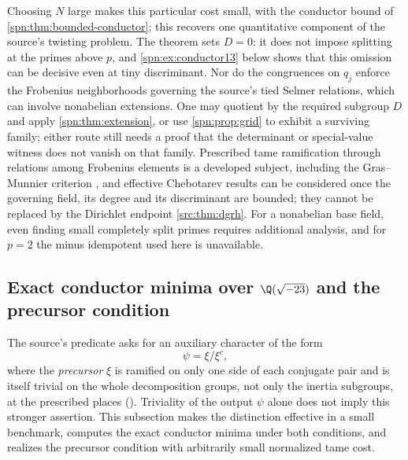 Choosing $N$ large makes this particular cost small, with the conductor bound
of \cref{spn:thm:bounded-conductor}; this recovers one quantitative component
of the source's twisting problem. The theorem sets $D=0$: it does not
impose splitting at the primes above $p$, and \cref{spn:ex:conductor13}
below shows that this omission can be decisive even at tiny discriminant. Nor
do the congruences on $q_j$ enforce the Frobenius neighborhoods governing the
source's tied Selmer relations, which can involve nonabelian extensions. One
may quotient by the required subgroup $D$ and apply
\cref{spn:thm:extension}, or use \cref{spn:prop:grid} to exhibit a surviving
family; either route still needs a proof that the determinant or
special-value witness does not vanish on that family. Prescribed tame
ramification through relations among Frobenius elements is a developed
subject, including the Gras--Munnier criterion \cite{Hajir2022Tame}, and
effective Chebotarev results \cite{Thorner2017Explicit} can be considered
once the governing field, its degree and its discriminant are bounded; they
cannot be replaced by the Dirichlet endpoint \cref{src:thm:dgrh}. For a
nonabelian base field, even finding small completely split primes requires
additional analysis, and for $p=2$ the minus idempotent used here is
unavailable.

\subsection{Exact conductor minima over \texorpdfstring{$\Q(\sqrt{-23})$}{Q(sqrt(-23))} and the precursor condition}\label{spn:sec:benchmark}

The source's predicate  asks for an auxiliary character of the
form
\[
 \psi=\xi/\xi^c ,
\]
where the \emph{precursor} $\xi$ is ramified on only one side of each
conjugate pair and is itself trivial on the whole decomposition groups, not
only the inertia subgroups, at the prescribed places
(). Triviality of the output $\psi$
alone does not imply this stronger assertion. This subsection makes the
distinction effective in a small benchmark, computes the exact conductor
minima under both conditions, and realizes the precursor condition with
arbitrarily small normalized tame cost.

